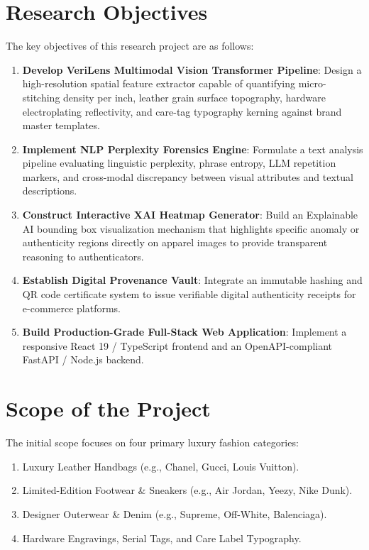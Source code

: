 \documentclass[a4paper,12pt]{report}
\begin{document}
\section{Research Objectives}
The key objectives of this research project are as follows:
\begin{enumerate}
    \item \textbf{Develop VeriLens Multimodal Vision Transformer Pipeline}: Design a high-resolution spatial feature extractor capable of quantifying micro-stitching density per inch, leather grain surface topography, hardware electroplating reflectivity, and care-tag typography kerning against brand master templates.
    \item \textbf{Implement NLP Perplexity Forensics Engine}: Formulate a text analysis pipeline evaluating linguistic perplexity, phrase entropy, LLM repetition markers, and cross-modal discrepancy between visual attributes and textual descriptions.
    \item \textbf{Construct Interactive XAI Heatmap Generator}: Build an Explainable AI bounding box visualization mechanism that highlights specific anomaly or authenticity regions directly on apparel images to provide transparent reasoning to authenticators.
    \item \textbf{Establish Digital Provenance Vault}: Integrate an immutable hashing and QR code certificate system to issue verifiable digital authenticity receipts for e-commerce platforms.
    \item \textbf{Build Production-Grade Full-Stack Web Application}: Implement a responsive React 19 / TypeScript frontend and an OpenAPI-compliant FastAPI / Node.js backend.
\end{enumerate}

\section{Scope of the Project}
The initial scope focuses on four primary luxury fashion categories:
\begin{enumerate}
    \item Luxury Leather Handbags (e.g., Chanel, Gucci, Louis Vuitton).
    \item Limited-Edition Footwear \& Sneakers (e.g., Air Jordan, Yeezy, Nike Dunk).
    \item Designer Outerwear \& Denim (e.g., Supreme, Off-White, Balenciaga).
    \item Hardware Engravings, Serial Tags, and Care Label Typography.
\end{enumerate}
\end{document}
